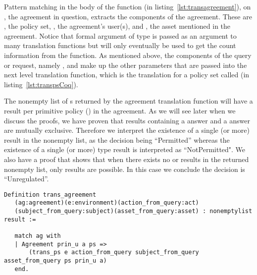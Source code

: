 Pattern matching in the body of the  function (in listing~\ref{lst:transagreement}), on , the agreement in question, extracts the components of the agreement. These are , the policy set, , the agreement's user(s), and , the asset mentioned in the agreement. Notice that formal argument  of type  is passed as an argument to many translation functions but will only eventually be used to get the count information from the  function. As mentioned above, the components of the query or request, namely ,  and  make up the other parameters that are passed into the next level translation function, which is the translation for a policy set called  (in listing~\ref{lst:transpsCoq}).


The nonempty list of s returned by the agreement translation function will have a result per primitive policy () in the agreement. As we will see later when we discuss the proofs, we have proven that results containing a  answer and a  answer are mutually exclusive. Therefore we interpret the existence of a single (or more)  result in the nonempty list, as the decision being ``Permitted'' whereas the existence of a single (or more)  type result is interpreted as ``NotPermitted". We also have a proof that shows that when there exists no  or  results in the returned nonempty list, only  results are possible. In this case we conclude the decision is ``Unregulated''. 

\begin{minipage}[c]{0.95\textwidth}
\begin{lstlisting}
Definition trans_agreement
   (ag:agreement)(e:environment)(action_from_query:act)
   (subject_from_query:subject)(asset_from_query:asset) : nonemptylist result :=

   match ag with
   | Agreement prin_u a ps => 
       (trans_ps e action_from_query subject_from_query asset_from_query ps prin_u a)
   end.
\end{lstlisting}
\end{minipage}


